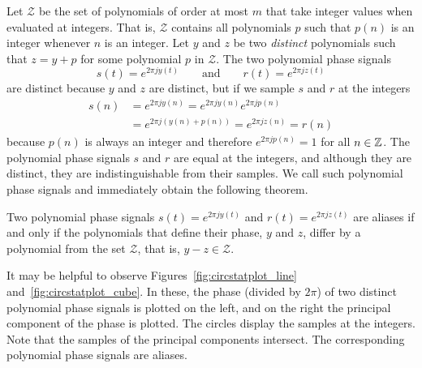 \documentclass[journal]{IEEEtran}
\begin{document}
Let $\mathcal{Z}$ be the set of polynomials of order at most $m$ that take integer values when evaluated at integers. That is, $\mathcal{Z}$ contains all polynomials $p$ such that $p(n)$ is an integer whenever $n$ is an integer.
Let $y$ and $z$ be two \emph{distinct} polynomials such that $z = y + p$ for some polynomial $p$ in $\mathcal{Z}$. The two polynomial phase signals
\[
s(t) = e^{2\pi j y(t)} \qquad \text{and} \qquad r(t) = e^{2\pi j z(t)}
\]
are distinct because $y$ and $z$ are distinct, but if we sample $s$ and $r$ at the integers  
\begin{align*}
s(n) &= e^{2\pi j y(n)} =  e^{2\pi j y(n)} e^{2\pi j p(n)} \\
&= e^{2\pi j (y(n) + p(n))} = e^{2\pi j z(n)} = r(n)
\end{align*}
because $p(n)$ is always an integer and therefore $e^{2\pi j p(n)} = 1$ for all $n \in {\mathbb Z}$. The polynomial phase signals $s$ and $r$ are equal at the integers, and although they are distinct, they are indistinguishable from their samples. We call such polynomial phase signals  and immediately obtain the following theorem.

\begin{theorem}\label{thm:circpolysampledthm}
Two polynomial phase signals $s(t) = e^{2\pi j y(t)}$  and $r(t) = e^{2\pi j z(t)}$  are aliases if and only if the polynomials that define their phase, $y$ and $z$, differ by a polynomial from the set $\mathcal{Z}$, that is, $y - z \in \mathcal{Z}$.
\end{theorem}



It may be helpful to observe Figures~\ref{fig:circstatplot_line} and~\ref{fig:circstatplot_cube}.  In these, the phase (divided by $2\pi$) of two distinct polynomial phase signals is plotted on the left, and on the right the principal component of the phase is plotted. The circles display the samples at the integers. Note that the samples of the principal components intersect.  The corresponding polynomial phase signals are aliases.
\end{document}
